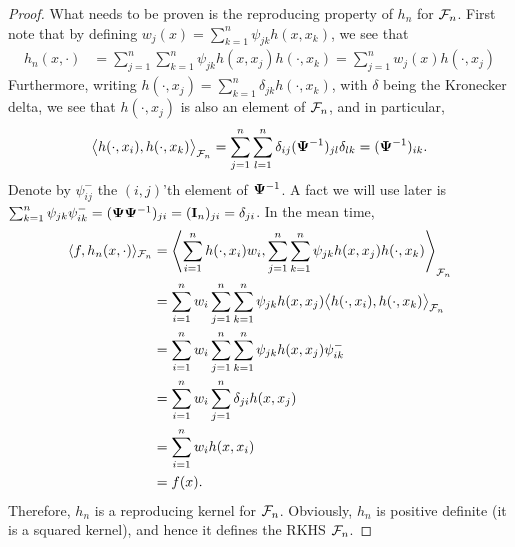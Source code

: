 \begin{proof}
  What needs to be proven is the reproducing property of $h_n$ for ${\mathcal F}_n$.
  First note that by defining $w_j(x) = \sum_{k=1}^n \psi_{jk} h(x,x_k)$, we see that
  \begin{align*}
    h_n(x,\cdot) 
    &= \sum_{j=1}^n\sum_{k=1}^n \psi_{jk} h(x,x_j) h(\cdot,x_k) 
    = \sum_{j=1}^n w_j(x)h(\cdot,x_j)
  \end{align*}
  Furthermore, writing $h(\cdot,x_j) = \sum_{k=1}^n \delta_{jk} h(\cdot,x_k)$, with $\delta$ being the Kronecker delta, we see that $h(\cdot,x_j)$ is also an element of ${\mathcal F}_n$, and in particular,
  \[
    \big\langle h(\cdot,x_i), h(\cdot,x_k) \big\rangle_{{\mathcal F}_n} 
    = \sum_{j=1}^n\sum_{l=1}^n \delta_{ij} ({\bm\Psi}^{-1})_{jl} \delta_{lk} = ({\bm\Psi}^{-1})_{ik}.
  \]
  Denote by $\psi_{ij}^{-}$ the $(i,j)$'th element of ${\bm\Psi}^{-1}$.
  A fact we will use later is $\sum_{k=1}^n \psi_{jk}\psi_{ik}^{-} = ({\bm\Psi}{\bm\Psi}^{-1})_{ji} = ({\mathbf I}_n)_{ji} = \delta_{ji}$.  
  In the mean time,
  \begin{align*}
    \langle f, h_n(x,\cdot)\rangle_{{\mathcal F}_n}
    &= \left\langle 
    \sum_{i=1}^n h(\cdot,x_i)w_i ,
    \sum_{j=1}^n\sum_{k=1}^n \psi_{jk} h(x,x_j) h(\cdot,x_k)
    \right\rangle_{{\mathcal F}_n} \\
    &= \sum_{i=1}^n w_i \sum_{j=1}^n\sum_{k=1}^n \psi_{jk} h(x,x_j) 
    \big\langle h(\cdot,x_i) , h(\cdot,x_k) \big\rangle_{{\mathcal F}_n} \\
    &= \sum_{i=1}^n w_i \sum_{j=1}^n\sum_{k=1}^n \psi_{jk}h(x,x_j)\psi_{ik}^{-} \\
    &= \sum_{i=1}^n w_i \sum_{j=1}^n \delta_{ji}h(x,x_j) \\
    &= \sum_{i=1}^n w_i h(x,x_i) \\
    &= f(x).
  \end{align*}
  Therefore, $h_n$ is a reproducing kernel for ${\mathcal F}_n$.
  Obviously, $h_n$ is positive definite (it is a squared kernel), and hence it defines the RKHS ${\mathcal F}_n$.
\end{proof}


